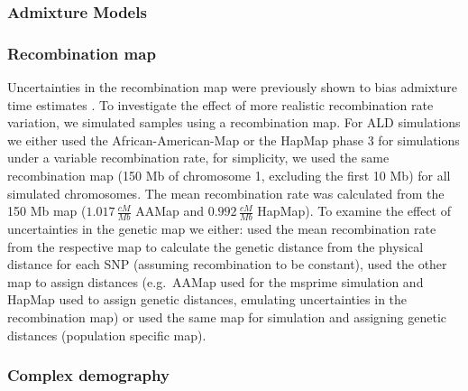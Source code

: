\documentclass[]{article}
\begin{document}
\subsubsection{Admixture Models}\label{admixture models}



\subsubsection{Recombination map}\label{recombination map}

Uncertainties in the recombination map were previously shown to bias
admixture time estimates \citep{sankararaman_date_2012,sankararaman_combined_2016,fu_genome_2014}. To investigate the effect of more realistic
recombination rate variation, we simulated samples using a recombination map. For ALD simulations we
either used the African-American-Map \citep{hinch_landscape_2011} or
the HapMap phase 3 \citep{HapMapConsortium_second_2007} for simulations
under a variable recombination rate, for simplicity, we used the same
recombination map (150 Mb of chromosome 1, excluding the first 10 Mb)
for all simulated chromosomes. The mean recombination rate was
calculated from the 150 Mb map (\(1.017 \, \frac{cM}{Mb}\) AAMap and
\(0.992 \, \frac{cM}{Mb}\) HapMap). To examine the effect of uncertainties in the
genetic map we either: used the mean recombination rate from the
respective map to calculate the genetic distance from the physical
distance for each SNP (assuming recombination to be constant), used the other map to assign distances
(e.g.~AAMap used for the msprime simulation and HapMap used to assign
genetic distances, emulating uncertainties in the recombination map) or used the same map for simulation and assigning
genetic distances (population specific map). 

\subsubsection{Complex demography}\label{inferred demography}
\end{document}
